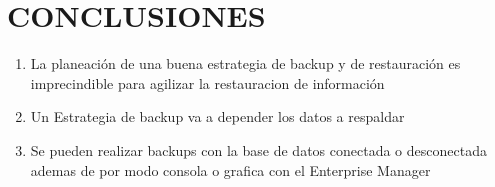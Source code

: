 \chapter{CONCLUSIONES}

\begin{enumerate}
\item La planeación de una buena estrategia de backup y de restauración es imprecindible para agilizar la restauracion de información
\item Un Estrategia de backup va a depender los datos a respaldar

\item Se pueden realizar backups con la base de datos conectada o desconectada ademas de por modo consola o grafica con el Enterprise Manager
\end{enumerate}